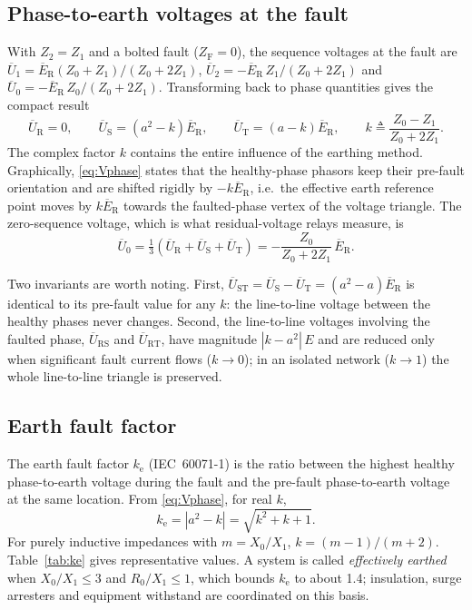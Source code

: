 \documentclass[a4paper,11pt]{article}
\newcommand{\ph}[1]{\mathrm{#1}}
\newcommand{\pE}[1]{\overline{E}_{\ph{#1}}}
\newcommand{\pU}[1]{\overline{U}_{\ph{#1}}}
\begin{document}
\subsection{Phase-to-earth voltages at the fault}

With $Z_{2}=Z_{1}$ and a bolted fault ($Z_\mathrm{F}=0$), the sequence
voltages at the fault are $\overline{U}_{1}=\pE{R}(Z_{0}+Z_{1})/(Z_{0}+2Z_{1})$,
$\overline{U}_{2}=-\pE{R}\,Z_{1}/(Z_{0}+2Z_{1})$ and
$\overline{U}_{0}=-\pE{R}\,Z_{0}/(Z_{0}+2Z_{1})$. Transforming back to phase
quantities gives the compact result
\begin{equation}
\boxed{\;
\pU{R} = 0, \qquad
\pU{S} = \left(a^{2}-k\right)\pE{R}, \qquad
\pU{T} = \left(a-k\right)\pE{R}, \qquad
k \triangleq \frac{Z_{0}-Z_{1}}{Z_{0}+2Z_{1}} .
\;}
\label{eq:Vphase}
\end{equation}
The complex factor $k$ contains the entire influence of the earthing method.
Graphically, \eqref{eq:Vphase} states that the healthy-phase phasors keep
their pre-fault orientation and are shifted rigidly by $-k\pE{R}$, i.e.\ the
effective earth reference point moves by $k\pE{R}$ towards the faulted-phase
vertex of the voltage triangle. The zero-sequence voltage, which is what
residual-voltage relays measure, is
\begin{equation}
\overline{U}_{0} = \tfrac{1}{3}\left(\pU{R}+\pU{S}+\pU{T}\right)
 = -\frac{Z_{0}}{Z_{0}+2Z_{1}}\,\pE{R}.
\label{eq:V0}
\end{equation}

Two invariants are worth noting. First, $\pU{ST}=\pU{S}-\pU{T}=(a^{2}-a)\pE{R}$
is identical to its pre-fault value for any $k$: the line-to-line voltage
between the healthy phases never changes. Second, the line-to-line voltages
involving the faulted phase, $\pU{RS}$ and $\pU{RT}$, have magnitude
$|k-a^{2}|\,E$ and are reduced only when significant fault current flows
($k\to 0$); in an isolated network ($k\to 1$) the whole line-to-line triangle
is preserved.

\subsection{Earth fault factor}

The earth fault factor $k_\mathrm{e}$ (IEC~60071-1) is the ratio between the
highest healthy phase-to-earth voltage during the fault and the pre-fault
phase-to-earth voltage at the same location. From \eqref{eq:Vphase}, for real
$k$,
\begin{equation}
k_\mathrm{e} = \left|a^{2}-k\right| = \sqrt{k^{2}+k+1}.
\label{eq:ke}
\end{equation}
For purely inductive impedances with $m = X_{0}/X_{1}$, $k = (m-1)/(m+2)$.
Table~\ref{tab:ke} gives representative values. A system is called
\emph{effectively earthed} when $X_{0}/X_{1}\le 3$ and $R_{0}/X_{1}\le 1$,
which bounds $k_\mathrm{e}$ to about 1.4; insulation, surge arresters and
equipment withstand are coordinated on this basis.
\end{document}
